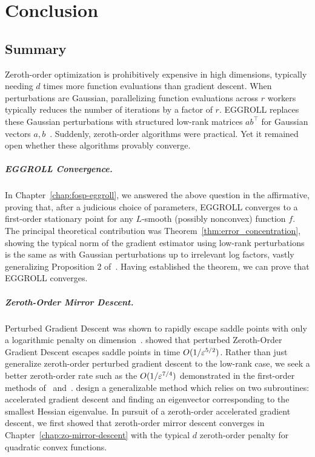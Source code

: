 \chapter[Conclusion]{Conclusion}
\label{chap:conclusion}

\section{Summary}
Zeroth-order optimization is prohibitively expensive in high dimensions, typically needing $d$ times more function evaluations than gradient descent. When perturbations are Gaussian, parallelizing function evaluations across $r$ workers typically reduces the number of iterations by a factor of $r$. EGGROLL replaces these Gaussian perturbations with structured low-rank matrices $ab^\top$ for Gaussian vectors $a,b$~\citep{sarkar2025evolution}. Suddenly, zeroth-order algorithms were practical. Yet it remained open whether these algorithms provably converge.

\paragraph{EGGROLL Convergence.}
In Chapter~\ref{chap:fosp-eggroll}, we answered the above question in the affirmative, proving that, after a judicious choice of parameters, EGGROLL converges to a first-order stationary point for any $L$-smooth (possibly nonconvex) function $f$. The principal theoretical contribution was Theorem~\ref{thm:error_concentration}, showing the typical norm of the gradient estimator using low-rank perturbations is the same as with Gaussian perturbations up to irrelevant log factors, vastly generalizing Proposition 2 of~\citet{ren2023escaping}. Having established the theorem, we can prove that EGGROLL converges.

\paragraph{Zeroth-Order Mirror Descent.}
Perturbed Gradient Descent was shown to rapidly escape saddle points with only a logarithmic penalty on dimension~\citep{jin2017escape}. \citet{ren2023escaping} showed that perturbed Zeroth-Order Gradient Descent escapes saddle points in time $O(1/\varepsilon^{5/2})$. Rather than just generalize zeroth-order perturbed gradient descent to the low-rank case, we seek a better zeroth-order rate such as the $O(1/\varepsilon^{7/4})$ demonstrated in the first-order methods of~\citet{carmon2018accelerated} and~\citet{jin2017accelerated}. \citet{carmon2018accelerated} design a generalizable method which relies on two subroutines: accelerated gradient descent and finding an eigenvector corresponding to the smallest Hessian eigenvalue. In pursuit of a zeroth-order accelerated gradient descent, we first showed that zeroth-order mirror descent converges in Chapter~\ref{chap:zo-mirror-descent} with the typical $d$ zeroth-order penalty for quadratic convex functions.


